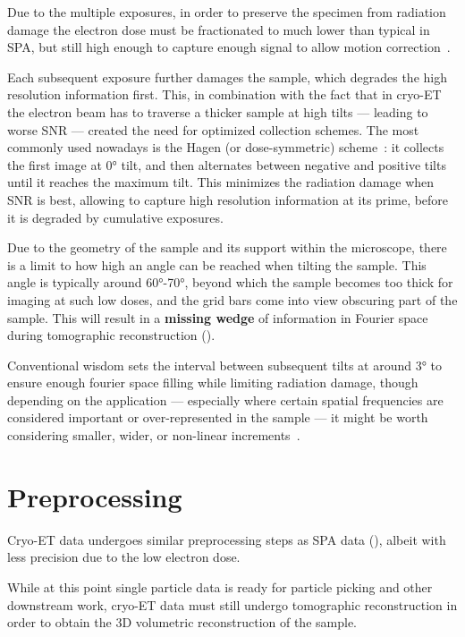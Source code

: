 Due to the multiple exposures, in order to preserve the specimen from radiation damage the electron dose must be fractionated to much lower than typical in SPA, but still high enough to capture enough signal to allow motion correction~\cite{mcewenRelevanceDosefractionationTomography1995}.

Each subsequent exposure further damages the sample, which degrades the high resolution information first.
This, in combination with the fact that in cryo-ET the electron beam has to traverse a thicker sample at high tilts --- leading to worse SNR --- created the need for optimized collection schemes.
The most commonly used nowadays is the Hagen (or dose-symmetric)  scheme~\cite{hagenImplementationCryoelectronTomography2017}: it collects the first image at \ang{0} tilt, and then alternates between negative and positive tilts until it reaches the maximum tilt.
This minimizes the radiation damage when SNR is best, allowing to capture high resolution information at its prime, before it is degraded by cumulative exposures.

Due to the geometry of the sample and its support within the microscope, there is a limit to how high an angle can be reached when tilting the sample.
This angle is typically around \ang{60}-\ang{70}, beyond which the sample becomes too thick for imaging at such low doses, and the grid bars come into view obscuring part of the sample.
This will result in a \textbf{missing wedge} of information in Fourier space during tomographic reconstruction ().

Conventional wisdom sets the interval between subsequent tilts at around \ang{3} to ensure enough fourier space filling while limiting radiation damage, though depending on the application --- especially where certain spatial frequencies are considered important or over-represented in the sample --- it might be worth considering smaller, wider, or non-linear increments~\cite{copeCryoElectronTomographyStructural2011}.

\section{Preprocessing}
Cryo-ET data undergoes similar preprocessing steps as SPA data (), albeit with less precision due to the low electron dose.

While at this point single particle data is ready for particle picking and other downstream work, cryo-ET data must still undergo tomographic reconstruction in order to obtain the 3D volumetric reconstruction of the sample.

